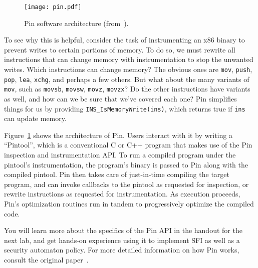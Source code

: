 \documentclass[11pt,twoside]{scrartcl}
\begin{document}
\begin{figure}[t]
\centering
\texttt{[image: pin.pdf]}
\caption{Pin software architecture (from~\cite{Luk2005}).}
\label{fig:pin}
\end{figure}

To see why this is helpful, consider the task of instrumenting an x86 binary to prevent writes to certain portions of memory. To do so, we must rewrite all instructions that can change memory with instrumentation to stop the unwanted writes. Which instructions can change memory? The obvious ones are \verb'mov', \verb'push', \verb'pop', \verb'lea', \verb'xchg', and perhaps a few others. But what about the many variants of \verb'mov', such as \verb'movsb', \verb'movsw', \verb'movz', \verb'movzx'? Do the other instructions have variants as well, and how can we be sure that we've covered each one? Pin simplifies things for us by providing \verb'INS_IsMemoryWrite(ins)', which returns true if \verb'ins' can update memory.

Figure~\ref{fig:pin} shows the architecture of Pin. Users interact with it by writing a ``Pintool'', which is a conventional C or C++ program that makes use of the Pin inspection and instrumentation API. To run a compiled program under the pintool's instrumentation, the program's binary is passed to Pin along with the compiled pintool. Pin then takes care of just-in-time compiling the target program, and can invoke callbacks to the pintool as requested for inspection, or rewrite instructions as requested for instrumentation. As execution proceeds, Pin's optimization routines run in tandem to progressively optimize the compiled code.

You will learn more about the specifics of the Pin API in the handout for the next lab, and get hands-on experience using it to implement SFI as well as a security automaton policy. For more detailed information on how Pin works, consult the original paper~\cite{Luk2005}.


\end{document}
